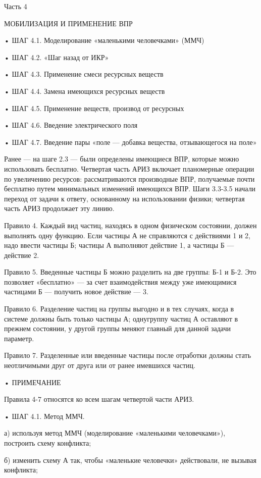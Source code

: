 Часть 4

МОБИЛИЗАЦИЯ И ПРИМЕНЕНИЕ ВПР


• ШАГ 4.1. Моделирование «маленькими человечками» (ММЧ)

• ШАГ 4.2. «Шаг назад от ИКР»

• ШАГ 4.3. Применение смеси ресурсных веществ

• ШАГ 4.4. Замена имеющихся ресурсных веществ

• ШАГ 4.5. Применение веществ, производ от ресурсных

• ШАГ 4.6. Введение электрического поля

• ШАГ  4.7. Введение пары  «поле — добавка вещества,  отзывающегося на
поле»


Ранее —  на шаге 2.3  — были  определены имеющиеся ВПР,  которые можно
использовать  бесплатно.  Четвертая  часть АРИЗ  включает  планомерные
операции  по  увеличению  ресурсов: рассматриваются  производные  ВПР,
получаемые почти бесплатно путем  минимальных изменений имеющихся ВПР.
Шаги  3.3-3.5  начали  переход  от задачи  к  ответу,  основанному  на
использовании физики; четвертая часть АРИЗ продолжает эту линию.

Правило 4. Каждый  вид частиц, находясь в  одном физическом состоянии,
должен  выполнять  одну  функцию.  Если частицы  А  не  справляются  с
действиями 1 и 2, надо ввести  частицы Б; частицы А выполняют действие
1, а частицы Б — действие 2.

Правило 5.  Введенные частицы Б можно  разделить на две группы:  Б-1 и
Б-2.  Это позволяет  «бесплатно» —  за счет  взаимодействия между  уже
имеющимися частицами Б — получить новое действие — 3.

Правило 6. Разделение частиц на группы  выгодно и в тех случаях, когда
в системе должны быть только  частицы А; однугруппу частиц А оставляют
в прежнем состоянии, у другой  группы меняют главный для данной задачи
параметр.

Правило 7.  Разделенные или  введенные частицы после  отработки должны
стать неотличимыми друг от друга или от ранее имевшихся частиц.

• ПРИМЕЧАНИЕ

Правила 4-7 относятся ко всем шагам четвертой части АРИЗ.


• ШАГ 4.1. Метод ММЧ.

а)  используя  метод  ММЧ  (моделирование  «маленькими  человечками»),
построить схему конфликта;

б) изменить схему  А так, чтобы «маленькие  человечки» действовали, не
вызывая конфликта;

